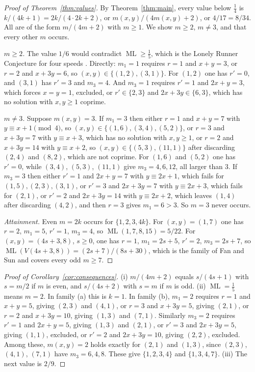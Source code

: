 \documentclass[12pt]{amsart}
\theoremstyle{definition}\newtheorem{definition}[theorem]{Definition}
\theoremstyle{remark}\newtheorem{remark}[theorem]{Remark}
\newcommand{\ML}{\operatorname{ML}}
\begin{document}
\begin{proof}[Proof of Theorem~\ref{thm:values}]
By Theorem~\ref{thm:main}, every value below $\frac14$ is $k/(4k+1)=2k/(4\cdot2k+2)$, or $m(x,y)/(4m(x,y)+2)$, or $4/17=8/34$. All are of the form $m/(4m+2)$ with $m\ge 1$. We show $m\ge2$, $m\ne 3$, and that every other $m$ occurs.

\emph{$m\ge2$.} The value $1/6$ would contradict $\ML\ge\frac15$, which is the Lonely Runner Conjecture for four speeds \cite{CusickPomerance,Bienia}. Directly: $m_1=1$ requires $r=1$ and $x+y=3$, or $r=2$ and $x+3y=6$, so $(x,y)\in\{(1,2),(3,1)\}$. For $(1,2)$ one has $r'=0$, and $(3,1)$ has $r'=3$ and $m_3=4$. And $m_3=1$ requires $r'=1$ and $2x+y=3$, which forces $x=y=1$, excluded, or $r'\in\{2,3\}$ and $2x+3y\in\{6,3\}$, which has no solution with $x,y\ge1$ coprime.

\emph{$m\ne3$.} Suppose $m(x,y)=3$. If $m_1=3$ then either $r=1$ and $x+y=7$ with $y\equiv x+1\pmod 4$, so $(x,y)\in\{(1,6),(3,4),(5,2)\}$, or $r=3$ and $x+3y=7$ with $y\equiv x+3$, which has no solution with $x,y\ge1$, or $r=2$ and $x+3y=14$ with $y\equiv x+2$, so $(x,y)\in\{(5,3),(11,1)\}$ after discarding $(2,4)$ and $(8,2)$, which are not coprime. For $(1,6)$ and $(5,2)$ one has $r'=0$, while $(3,4)$, $(5,3)$, $(11,1)$ give $m_3=4,6,12$, all larger than $3$. If $m_3=3$ then either $r'=1$ and $2x+y=7$ with $y\equiv 2x+1$, which fails for $(1,5),(2,3),(3,1)$, or $r'=3$ and $2x+3y=7$ with $y\equiv 2x+3$, which fails for $(2,1)$, or $r'=2$ and $2x+3y=14$ with $y\equiv 2x+2$, which leaves $(1,4)$ after discarding $(4,2)$, and then $r=3$ gives $m_1=6>3$. So $m=3$ never occurs.

\emph{Attainment.} Even $m=2k$ occurs for $\{1,2,3,4k\}$. For $(x,y)=(1,7)$ one has $r=2$, $m_1=5$, $r'=1$, $m_3=4$, so $\ML(1,7,8,15)=5/22$. For $(x,y)=(4s+3,8)$, $s\ge0$, one has $r=1$, $m_1=2s+5$, $r'=2$, $m_3=2s+7$, so $\ML(V(4s+3,8))=(2s+7)/(8s+30)$, which is the family of Fan and Sun and covers every odd $m\ge7$.
\end{proof}

\begin{proof}[Proof of Corollary~\ref{cor:consequences}]
(i) $m/(4m+2)$ equals $s/(4s+1)$ with $s=m/2$ if $m$ is even, and $s/(4s+2)$ with $s=m$ if $m$ is odd. (ii) $\ML=\frac15$ means $m=2$. In family (a) this is $k=1$. In family (b), $m_1=2$ requires $r=1$ and $x+y=5$, giving $(2,3)$ and $(4,1)$, or $r=3$ and $x+3y=5$, giving $(2,1)$, or $r=2$ and $x+3y=10$, giving $(1,3)$ and $(7,1)$. Similarly $m_3=2$ requires $r'=1$ and $2x+y=5$, giving $(1,3)$ and $(2,1)$, or $r'=3$ and $2x+3y=5$, giving $(1,1)$, excluded, or $r'=2$ and $2x+3y=10$, giving $(2,2)$, excluded. Among these, $m(x,y)=2$ holds exactly for $(2,1)$ and $(1,3)$, since $(2,3)$, $(4,1)$, $(7,1)$ have $m_3=6,4,8$. These give $\{1,2,3,4\}$ and $\{1,3,4,7\}$. (iii) The next value is $2/9$.
\end{proof}
\end{document}
